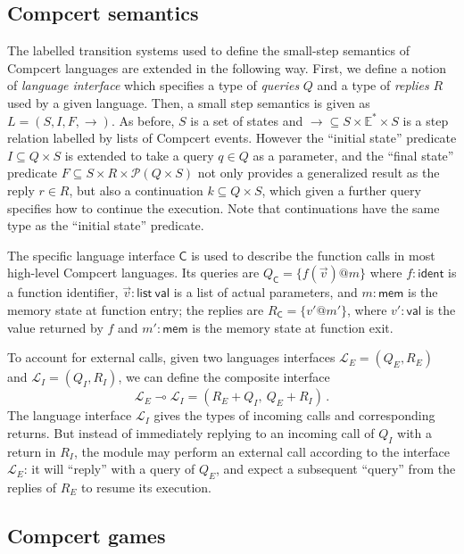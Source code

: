 \documentclass[11pt]{article}
\newcommand{\kw}[1]{{\mathsf{#1}}}
\begin{document}
\subsection{Compcert semantics}

The labelled transition systems
used to define the small-step semantics of Compcert languages
are extended in the following way.
First,
we define a notion of \emph{language interface}
which specifies a type of \emph{queries} $Q$ and a type of \emph{replies} $R$
used by a given language.
Then, a small step semantics is given as $L = (S, I, F, {\rightarrow})$.
As before, $S$ is a set of states and
${\rightarrow} \subseteq S \times \mathbb{E}^* \times S$
is a step relation labelled by lists of Compcert events.
However the ``initial state'' predicate $I \subseteq Q \times S$
is extended to take a query $q \in Q$ as a parameter,
and the ``final state'' predicate
$F \subseteq S \times R \times \mathcal{P}(Q \times S)$
not only provides a generalized result as the reply $r \in R$,
but also a continuation $k \subseteq Q \times S$,
which given a further query specifies how to continue the execution.
Note that continuations
have the same type as the ``initial state'' predicate.

The specific language interface $\kw{C}$
is used to describe the function calls in most high-level Compcert languages.
Its queries are $Q_\kw{C} = \{ f(\vec{v})@m \}$
where $f : \kw{ident}$ is a function identifier,
$\vec{v} : \kw{list}\ \kw{val}$ is a list of actual parameters, and
$m : \kw{mem}$ is the memory state at function entry;
the replies are $R_\kw{C} = \{ v'@m' \}$,
where $v' : \kw{val}$ is the value returned by $f$ and
$m' : \kw{mem}$ is the memory state at function exit.

To account for external calls,
given two languages interfaces
$\mathcal{L}_E = (Q_E, R_E)$ and
$\mathcal{L}_I = (Q_I, R_I)$,
we can define the composite interface
\[ \mathcal{L}_E \multimap \mathcal{L}_I = (R_E + Q_I, \: Q_E + R_I)\,. \]
The language interface $\mathcal{L}_I$
gives the types of incoming calls and corresponding returns.
But instead of immediately replying to an incoming call of $Q_I$
with a return in $R_I$,
the module may perform an external call
according to the interface $\mathcal{L}_E$:
it will ``reply'' with a query of $Q_E$,
and expect a subsequent ``query'' from the replies of $R_E$
to resume its execution.

\subsection{Compcert games}
\end{document}
